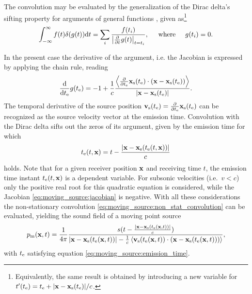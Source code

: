 The convolution may be evaluated by the generalization of the Dirac delta's sifting property for arguments of general functions \cite{Dowling1983, Crighton1992, Jackson1999}, given as\footnote{
Equivalently, the same result is obtained by introducing a new variable for $t'(t_{\mathrm{e}}) = t_{\mathrm{e}} + |\mathbf{x}-\mathbf{x}_{\mathrm{s}}(t_{\mathrm{e}})|/c$.}
\begin{equation}
\int_{-\infty}^{\infty} f(t) \delta(g(t)) \mathrm{d} t = \sum_{i} \frac{f(t_i)}{\left| \frac{\partial}{\partial t} g(t) \right|_{t = t_i}}, \hspace{5mm} \text{where} \hspace{5mm} g(t_i) = 0.
\end{equation}

In the present case the derivative of the argument, i.e. the Jacobian is expressed by applying the chain rule, reading 
\begin{equation}
\label{eq:moving_source:jacobian}
\frac{\mathrm{d} }{\mathrm{d} t_{\mathrm{e}}} g(t_{\mathrm{e}}) = - 1 + \frac{1}{c} \frac{\left< \frac{\partial}{\partial t_{\mathrm{e}}} \mathbf{x}_{\mathrm{s}}(t_{\mathrm{e}}) \cdot (\mathbf{x}-\mathbf{x}_{\mathrm{s}}(t_{\mathrm{e}}))\right> }{|\mathbf{x}-\mathbf{x}_{\mathrm{s}}(t_{\mathrm{e}})|}.
\end{equation}
The temporal derivative of the source position  $\mathbf{v}_{\mathrm{s}}(t_{\mathrm{e}}) = \frac{\partial}{\partial t_{\mathrm{e}}}\mathbf{x}_{\mathrm{s}}(t_{\mathrm{e}})$ can be recognized as the source velocity vector at the emission time.
Convolution with the Dirac delta sifts out the zeros of its argument, given by the emission time for which
\begin{equation}
\label{eq:moving_source:emission_time}
t_{\mathrm{e}}(t,\mathbf{x}) = t - \frac{|\mathbf{x}-\mathbf{x}_{\mathrm{s}}(t_{\mathrm{e}}(t,\mathbf{x}))|}{c}
\end{equation}
holds.
Note that for a given receiver position $\mathbf{x}$ and receiving time $t$, the emission time instant $t_{\mathrm{e}}(t,\mathbf{x})$ is a dependent variable.
For subsonic velocities (i.e.\ $v<c$) only the positive real root for this quadratic equation is considered, while the Jacobian \eqref{eq:moving_source:jacobian} is negative.
With all these considerations the non-stationary convolution \eqref{eq:moving_source:non_stat_convolution} can be evaluated, yielding the sound field of a moving point source
\begin{equation}
p_{\mathrm{m}}(\mathbf{x},t) =
\frac{1}{4\pi} \frac{ s(t - \frac{|\mathbf{x}-\mathbf{x}_{\mathrm{s}}(t_{\mathrm{e}}(\mathbf{x},t))|}{c} ) }{|\mathbf{x}-\mathbf{x}_{\mathrm{s}}(t_{\mathrm{e}}(\mathbf{x},t))| - \frac{1}{c}\left< \mathbf{v}_{\mathrm{s}}(t_{\mathrm{e}}(\mathbf{x},t)) \cdot (\mathbf{x}-\mathbf{x}_{\mathrm{s}}(t_{\mathrm{e}}(\mathbf{x},t)))\right> },
\end{equation}
with $t_{\mathrm{e}}$ satisfying equation \eqref{eq:moving_source:emission_time}. 

